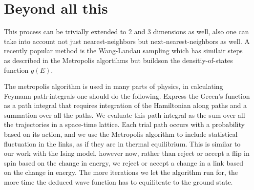 \documentclass[12pt]{article}
\theoremstyle{plain}
\begin{document}
\vspace{2mm}

\section{Beyond all this}

\vspace{2mm}

\par This process can be trivially extended to 2 and 3 dimensions as well,
also one can take into account not just nearest-neighbors but next-nearest-neighbors as well. 
A recently popular method is the Wang-Landau sampling which has similair steps as 
described in the Metropolis algortihms but buildson the densitiy-of-states function $g(E)$.

\vspace{2mm}

\par The metropolis algorithm is used in many parts of physics, in calculating 
Feymann path-integrals one should do the following. Express the Green’s function as a path integral that requires
integration of the Hamiltonian along paths and a summation over all the paths. We
evaluate this path integral as the sum over all the trajectories in a space-time lattice. Each
trial path occurs with a probability based on its action, and we use the Metropolis algorithm to
include statistical fluctuation in the links, as if they are in thermal equilibrium. This is similar
to our work with the Ising model, however now, rather than reject or accept a flip in
spin based on the change in energy, we reject or accept a change in a link based on the change
in energy. The more iterations we let the algorithm run for, the more time the deduced wave
function has to equilibrate to the ground state.

\vfill



\end{document}
